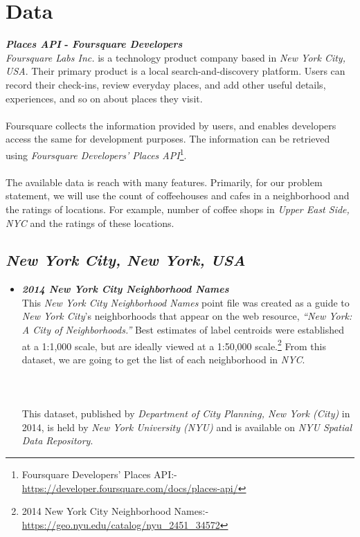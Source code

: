 \documentclass{article}
\begin{document}
\section{Data}
\textbf{\textit{Places API} - \textit{Foursquare Developers}}\\{\textit{Foursquare Labs Inc.} is a technology product company based in \textit{New York City, USA}. Their primary product is a local search-and-discovery platform. Users can record their check-ins, review everyday places, and add other useful details, experiences, and so on about places they visit.}\\\\{Foursquare collects the information provided by users, and enables developers access the same for development purposes. The information can be retrieved using \textit{Foursquare Developers' Places API}\footnote{Foursquare Developers' Places API:- \url{https://developer.foursquare.com/docs/places-api/}}.}\\\\{The available data is reach with many features. Primarily, for our problem statement, we will use the count of coffeehouses and cafes in a neighborhood and the ratings of locations. For example, number of coffee shops in \textit{Upper East Side, NYC} and the ratings of these locations.}
\subsection{\textit{New York City, New York, USA}}
\begin{itemize}
    \item \textbf{\textit{2014 New York City Neighborhood Names}}\\{This \textit{New York City Neighborhood Names} point file was created as a guide to \textit{New York City}’s neighborhoods that appear on the web resource, \textit{“New York: A City of Neighborhoods.”} Best estimates of label centroids were established at a 1:1,000 scale, but are ideally viewed at a 1:50,000 scale.\footnote{2014 New York City Neighborhood Names:- \url{https://geo.nyu.edu/catalog/nyu\_2451\_34572}} From this dataset, we are going to get the list of each neighborhood in \textit{NYC}.}\\\\\\\\{This dataset, published by \textit{Department of City Planning, New York (City)} in 2014, is held by \textit{New York University (NYU)} and is available on \textit{NYU Spatial Data Repository}.}
\end{itemize}
\end{document}
